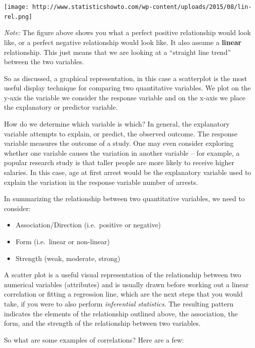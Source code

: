 \documentclass[]{book}
\providecommand{\tightlist}{%
  \setlength{\itemsep}{0pt}\setlength{\parskip}{0pt}}
\theoremstyle{definition}
\theoremstyle{definition}
\theoremstyle{definition}
\theoremstyle{remark}
\begin{document}
\texttt{[image: http://www.statisticshowto.com/wp-content/uploads/2015/08/lin-rel.png]}

\emph{Note:} The figure above shows you what a perfect positive
relationship would look like, or a perfect negative relationship would
look like. It also assume a \textbf{linear} relationship. This just
means that we are looking at a ``straight line trend'' between the two
variables.

So as discussed, a graphical representation, in this case a scatterplot
is the most useful display technique for comparing two quantitative
variables. We plot on the y-axis the variable we consider the response
variable and on the x-axis we place the explanatory or predictor
variable.

How do we determine which variable is which? In general, the explanatory
variable attempts to explain, or predict, the observed outcome. The
response variable measures the outcome of a study. One may even consider
exploring whether one variable causes the variation in another variable
-- for example, a popular research study is that taller people are more
likely to receive higher salaries. In this case, age at first arrest
would be the explanatory variable used to explain the variation in the
response variable number of arrests.

In summarizing the relationship between two quantitative variables, we
need to consider:

\begin{itemize}
\tightlist
\item
  Association/Direction (i.e.~positive or negative)
\item
  Form (i.e.~linear or non-linear)
\item
  Strength (weak, moderate, strong)
\end{itemize}

A scatter plot is a useful visual representation of the relationship
between two numerical variables (attributes) and is usually drawn before
working out a linear correlation or fitting a regression line, which are
the next steps that you would take, if you were to also perform
\emph{inferential statistics}. The resulting pattern indicates the
elements of the relationship outlined above, the association, the form,
and the strength of the relationship between two variables.

So what are some examples of correlations? Here are a few:
\end{document}
